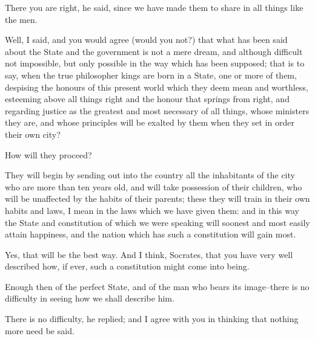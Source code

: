 There you are right, he said, since we have made them to share in all
things like the men.

Well, I said, and you would agree (would you not?) that what has
been said about the State and the government is not a mere dream, and
although difficult not impossible, but only possible in the way which
has been supposed; that is to say, when the true philosopher kings are
born in a State, one or more of them, despising the honours of this
present world which they deem mean and worthless, esteeming above all
things right and the honour that springs from right, and regarding
justice as the greatest and most necessary of all things, whose
ministers they are, and whose principles will be exalted by them when
they set in order their own city?

How will they proceed?

They will begin by sending out into the country all the inhabitants of
the city who are more than ten years old, and will take possession of
their children, who will be unaffected by the habits of their parents;
these they will train in their own habits and laws, I mean in the laws
which we have given them: and in this way the State and constitution of
which we were speaking will soonest and most easily attain happiness,
and the nation which has such a constitution will gain most.

Yes, that will be the best way. And I think, Socrates, that you have
very well described how, if ever, such a constitution might come into
being.

Enough then of the perfect State, and of the man who bears its
image--there is no difficulty in seeing how we shall describe him.

There is no difficulty, he replied; and I agree with you in thinking
that nothing more need be said.








